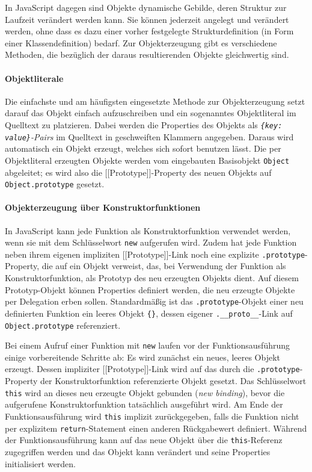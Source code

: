 In JavaScript dagegen sind Objekte dynamische Gebilde, deren Struktur zur Laufzeit verändert werden kann. Sie können jederzeit angelegt und verändert werden, ohne dass es dazu einer vorher festgelegte Strukturdefinition (in Form einer Klassendefinition) bedarf. Zur Objekterzeugung gibt es verschiedene Methoden, die bezüglich der daraus resultierenden Objekte gleichwertig sind. 

\paragraph{Objektliterale} Die einfachste und am häufigsten eingesetzte Methode zur Objekterzeugung setzt darauf das Objekt einfach aufzuschreiben und ein sogenanntes Objektliteral im Quelltext zu platzieren. Dabei werden die 
Properties des Objekts als \emph{\texttt{\{key: value\}}-Pairs} im Quelltext in geschweiften Klammern angegeben. Daraus wird automatisch ein Objekt erzeugt, welches sich sofort benutzen lässt. Die per Objektliteral erzeugten Objekte werden vom eingebauten Basisobjekt \texttt{Object} abgeleitet; es wird also die [[Prototype]]-Property des neuen Objekts auf \texttt{Object.prototype} gesetzt.


\paragraph{Objekterzeugung über Konstruktorfunktionen} In JavaScript kann jede Funktion als Konstruktorfunktion verwendet werden, wenn sie mit dem Schlüsselwort \texttt{new} aufgerufen wird. Zudem hat jede Funktion neben ihrem eigenen impliziten [[Proto\-type]]-Link noch eine explizite \texttt{.prototype}-Property, die auf ein Objekt verweist, das, bei Verwendung der Funktion als Konstruktorfunktion, als Prototyp des neu erzeugten Objekts dient. Auf diesem Prototyp-Objekt können Properties definiert werden, die neu erzeugte Objekte per Delegation erben sollen. Standardmäßig ist das \texttt{.prototype}-Objekt einer neu definierten Funktion ein leeres Objekt \texttt{\{\}}, dessen eigener \texttt{.\_\_proto\_\_}-Link auf \texttt{Object.prototype} referenziert.

Bei einem Aufruf einer Funktion mit \texttt{new} laufen vor der Funktionsausführung einige vorbereitende Schritte ab: Es wird zunächst ein neues, leeres Objekt erzeugt. Dessen impliziter [[Prototype]]-Link wird auf das durch die \texttt{.prototype}-Property der Konstruktorfunktion referenzierte Objekt gesetzt. Das Schlüsselwort \texttt{this} wird an dieses neu erzeugte Objekt gebunden (\emph{new binding}), bevor die aufgerufene Konstruktorfunktion tatsächlich ausgeführt wird. Am Ende der Funktionsausführung wird \texttt{this} implizit zurückgegeben, falls die Funktion nicht per explizitem \texttt{return}-Statement einen anderen Rückgabewert definiert. 
Während der Funktionsausführung kann auf das neue Objekt über die \texttt{this}-Referenz zugegriffen werden und das Objekt kann verändert und seine Properties initialisiert werden.


